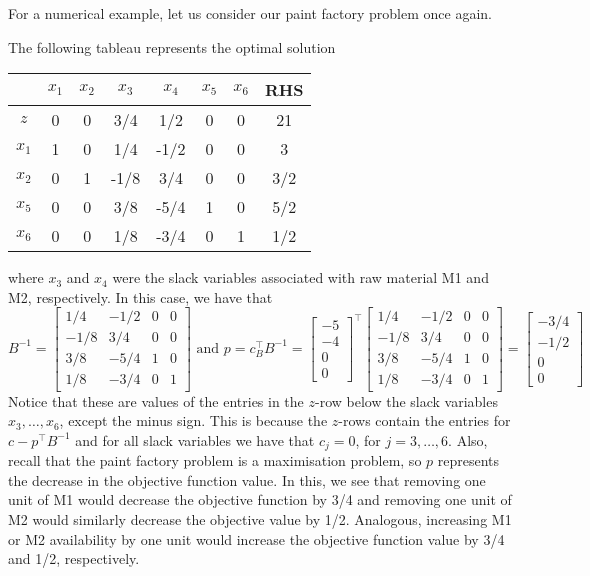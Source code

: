 For a numerical example, let us consider our paint factory problem once again. 


The following tableau represents the optimal solution
%
\begin{center}
	\begin{tabular}{c|cccccc|c}
		     & $x_1$ & $x_2$ & $x_3$ & $x_4$ & $x_5$ & $x_6$ & RHS \\ \hline 
		$z$  & 0  & 0 & 3/4 & 1/2 & 0 & 0 & 21   \\ \hline
	   $x_1$ & 1  & 0 & 1/4 & -1/2 & 0 & 0 & 3 \\
	   $x_2$ & 0  & 1 &-1/8 & 3/4 & 0 & 0 & 3/2  \\
	   $x_5$ & 0  & 0 & 3/8 &-5/4 & 1 & 0 & 5/2  \\
	   $x_6$ & 0  & 0 & 1/8 &-3/4 & 0 & 1 & 1/2  \\ \hline
	\end{tabular}
\end{center}
%
where $x_3$ and $x_4$ were the slack variables associated with raw material M1 and M2, respectively. In this case, we have that 
$$
B^{-1} = \begin{bmatrix}
 		   1/4 & -1/2 & 0 & 0 \\
		  -1/8 & 3/4 & 0 & 0 \\
		   3/8 &-5/4 & 1 & 0 \\
		   1/8 &-3/4 & 0 & 1
 		 \end{bmatrix} \text{ and } p = c_B^\top B^{-1} =  
 		 \begin{bmatrix}
 		 	-5 \\
 		 	-4 \\
 		 	0 \\
 		 	0
 		 \end{bmatrix}^\top
 		 \begin{bmatrix}
 		   1/4 & -1/2 & 0 & 0 \\
		  -1/8 & 3/4 & 0 & 0 \\
		   3/8 &-5/4 & 1 & 0 \\
		   1/8 &-3/4 & 0 & 1
 		 \end{bmatrix}  = 
 		 \begin{bmatrix}
 		 	-3/4 \\ -1/2 \\ 0 \\ 0
 		 \end{bmatrix}
$$
Notice that these are values of the entries in the $z$-row below the slack variables $x_3, \dots, x_6$, except the minus sign. This is because the $z$-rows contain the entries for $c - p^\top B^{-1}$ and for all slack variables we have that $c_j = 0$, for $j = 3,\dots,6$. Also, recall that the paint factory problem is a maximisation problem, so $p$ represents the decrease in the objective function value. In this, we see that removing one unit of M1 would decrease the objective function by 3/4 and removing one unit of M2 would similarly decrease the objective value by 1/2. Analogous, increasing M1 or M2 availability by one unit would increase the objective function value by 3/4 and 1/2, respectively. 


